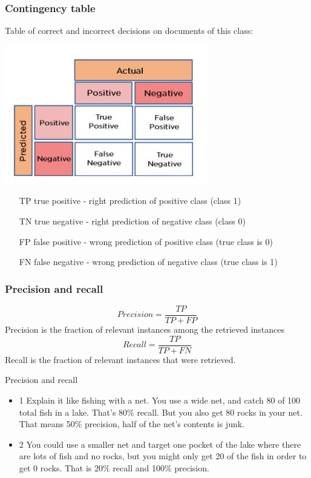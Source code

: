 \documentclass[svgnames]{beamer}
\begin{document}
\begin{frame}
  \frametitle{Contingency table}

 Table of correct and incorrect decisions on documents of this class:

  \includegraphics[height=.4\textheight]{confusion-matrix-small}

  \begin{itemize}
  \item[TP] true positive - right prediction of positive class (class 1)
  \item[TN] true negative - right prediction of negative class (class 0)
  \item[FP] false positive - wrong prediction of positive class (true class is 0)
  \item[FN] false negative - wrong prediction of negative class (true class is 1)
  \end{itemize}
\end{frame}

\begin{frame}
  \frametitle{Precision and recall}
  \begin{equation}
    \label{eq:p}
    Precision=\frac{TP}{TP + FP}
  \end{equation}
 Precision is the fraction of relevant instances among the retrieved instances
  \begin{equation}
    \label{eq:r}
    Recall=\frac{TP}{TP + FN}
  \end{equation}
Recall is the fraction of relevant instances that were retrieved.
\end{frame}

\begin{frame}{Precision and recall}
\begin{itemize}
  \item 1
Explain it like fishing with a net. You use a wide net, and catch 80 of 100 total fish in a lake. That’s 80\% recall. But you also get 80 rocks in your net. That means 50\% precision, half of the net’s contents is junk.
\item 2
You could use a smaller net and target one pocket of the lake where there are lots of fish and no rocks, but you might only get 20 of the fish in order to get 0 rocks. That is 20\% recall and 100\% precision.

\end{itemize}
\end{frame}
\end{document}
